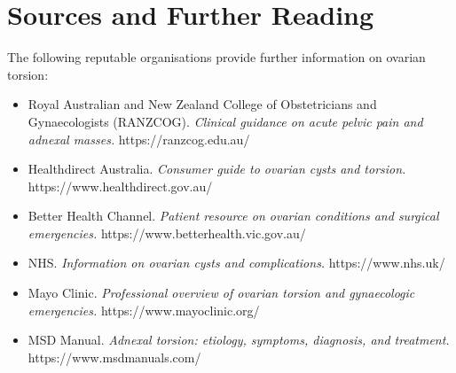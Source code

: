 \section*{Sources and Further Reading}
The following reputable organisations provide further information on ovarian torsion:
\begin{itemize}
    \item Royal Australian and New Zealand College of Obstetricians and Gynaecologists (RANZCOG). \textit{Clinical guidance on acute pelvic pain and adnexal masses.} https://ranzcog.edu.au/
    \item Healthdirect Australia. \textit{Consumer guide to ovarian cysts and torsion.} https://www.healthdirect.gov.au/
    \item Better Health Channel. \textit{Patient resource on ovarian conditions and surgical emergencies.} https://www.betterhealth.vic.gov.au/
    \item NHS. \textit{Information on ovarian cysts and complications.} https://www.nhs.uk/
    \item Mayo Clinic. \textit{Professional overview of ovarian torsion and gynaecologic emergencies.} https://www.mayoclinic.org/
    \item MSD Manual. \textit{Adnexal torsion: etiology, symptoms, diagnosis, and treatment.} https://www.msdmanuals.com/
\end{itemize}
